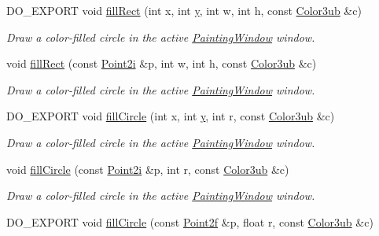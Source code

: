 \begin{DoxyCompactItemize}
D\-O\-\_\-\-E\-X\-P\-O\-R\-T void \hyperlink{group___draw2_d_ga0304730b10cb0cc85cf54fce55dd56f8}{fill\-Rect} (int x, int \hyperlink{group___channel_accessors_gac90c52c5b3a7b2a7e3761e6e84f25778}{y}, int w, int h, const \hyperlink{group___color_types_ga018b76cd00a4f9dca7dd06246d5bd3aa}{Color3ub} \&c)
\begin{DoxyCompactList}\small\item\em Draw a color-\/filled circle in the active \hyperlink{class_d_o_1_1_painting_window}{Painting\-Window} window. \end{DoxyCompactList}\item 
void \hyperlink{group___draw2_d_ga38298352a8d082ea8a9d26eb3be3b368}{fill\-Rect} (const \hyperlink{group___eigen_typedefs_ga048a27763e58f682b1b91af86144f701}{Point2i} \&p, int w, int h, const \hyperlink{group___color_types_ga018b76cd00a4f9dca7dd06246d5bd3aa}{Color3ub} \&c)
\begin{DoxyCompactList}\small\item\em Draw a color-\/filled circle in the active \hyperlink{class_d_o_1_1_painting_window}{Painting\-Window} window. \end{DoxyCompactList}\item 
D\-O\-\_\-\-E\-X\-P\-O\-R\-T void \hyperlink{group___draw2_d_ga7758ea21077f78b7d312dcdc8f4e83ed}{fill\-Circle} (int x, int \hyperlink{group___channel_accessors_gac90c52c5b3a7b2a7e3761e6e84f25778}{y}, int r, const \hyperlink{group___color_types_ga018b76cd00a4f9dca7dd06246d5bd3aa}{Color3ub} \&c)
\begin{DoxyCompactList}\small\item\em Draw a color-\/filled circle in the active \hyperlink{class_d_o_1_1_painting_window}{Painting\-Window} window. \end{DoxyCompactList}\item 
void \hyperlink{group___draw2_d_gaf463f29531934900d51e68c5533bdd9b}{fill\-Circle} (const \hyperlink{group___eigen_typedefs_ga048a27763e58f682b1b91af86144f701}{Point2i} \&p, int r, const \hyperlink{group___color_types_ga018b76cd00a4f9dca7dd06246d5bd3aa}{Color3ub} \&c)
\begin{DoxyCompactList}\small\item\em Draw a color-\/filled circle in the active \hyperlink{class_d_o_1_1_painting_window}{Painting\-Window} window. \end{DoxyCompactList}\item 
D\-O\-\_\-\-E\-X\-P\-O\-R\-T void \hyperlink{group___draw2_d_gab52e27210e68ac177b681a7cdcbaa359}{fill\-Circle} (const \hyperlink{group___eigen_typedefs_ga02df8c02295a7722cc3f5b89e8137464}{Point2f} \&p, float r, const \hyperlink{group___color_types_ga018b76cd00a4f9dca7dd06246d5bd3aa}{Color3ub} \&c)

\end{DoxyCompactItemize}
